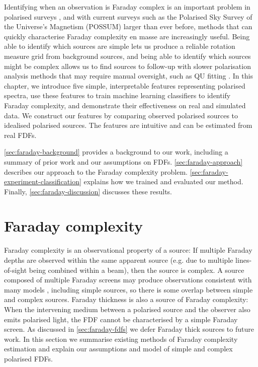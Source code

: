   Identifying when an observation is Faraday complex is an important problem in polarised surveys \citep{sun15comparison}, and with current surveys such as the Polarised Sky Survey of the Universe's Magnetism (POSSUM) larger than ever before, methods that can quickly characterise Faraday complexity en masse are increasingly useful. Being able to identify which sources are simple lets us produce a reliable rotation measure grid from background sources, and being able to identify which sources might be complex allows us to find sources to follow-up with slower polarisation analysis methods that may require manual oversight, such as QU fitting \citep[as seen in e.g.][]{miyashita19qu,osullivan_broad-band_2017}. In this chapter, we introduce five simple, interpretable features representing polarised spectra, use these features to train machine learning classifiers to identify Faraday complexity, and demonstrate their effectiveness on real and simulated data. We construct our features by comparing observed polarised sources to idealised polarised sources. The features are intuitive and can be estimated from real FDFs.

  \autoref{sec:faraday-background} provides a background to our work, including a summary of prior work and our assumptions on FDFs. \autoref{sec:faraday-approach} describes our approach to the Faraday complexity problem. \autoref{sec:faraday-experiment-classification} explains how we trained and evaluated our method. Finally, \autoref{sec:faraday-discussion} discusses these results.

\section{Faraday complexity}
\label{sec:faraday-background}

    Faraday complexity is an observational property of a source: If multiple Faraday depths are observed within the same apparent source (e.g. due to multiple lines-of-sight being combined within a beam), then the source is complex. A source composed of multiple Faraday screens may produce observations consistent with many models \citep{sun15comparison}, including simple sources, so there is some overlap between simple and complex sources. Faraday thickness is also a source of Faraday complexity: When the intervening medium between a polarised source and the observer also emits polarised light, the FDF cannot be characterised by a simple Faraday screen. As discussed in \autoref{sec:faraday-fdfs} we defer Faraday thick sources to future work. In this section we summarise existing methods of Faraday complexity estimation and explain our assumptions and model of simple and complex polarised FDFs.

